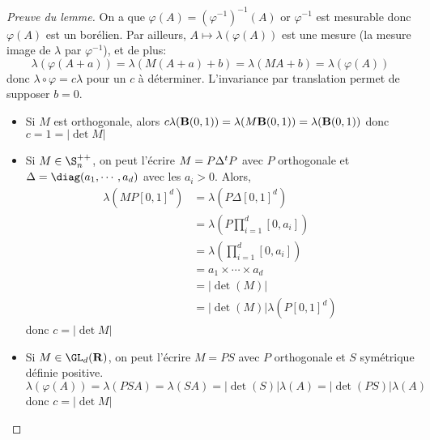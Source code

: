 \begin{proof}[Preuve du lemme]
    On a que $\varphi(A)= (\varphi^{-1})^{-1}(A)$ or $\varphi^{-1}$ est mesurable donc $\varphi(A)$ est un borélien. Par ailleurs, $A \longmapsto \lambda(\varphi(A))$ est une mesure (la mesure image de $ \lambda$ par $\varphi^{-1}$), et de plus: \[
        \lambda(\varphi(A+a))=\lambda(M(A+a)+b)=\lambda(MA+b)=\lambda(\varphi(A))
    \] 
    donc $ \lambda \circ \varphi=c\lambda$ pour un $c$ à déterminer. L'invariance par translation permet de supposer  $b=0$.
     \begin{itemize}
         \item Si $M$ est orthogonale, alors  $c\lambda(\mathbf B(0,1))=\lambda(M\mathbf B(0,1))=\lambda(\mathbf B(0,1))$ donc $c=1=|\det M|$ 
         \item Si $ M \in  \S_n^{++}$, on peut l'écrire $M=P\Delta {}^t P$ avec  $P$ orthogonale et  $\Delta = \diag(a_1, \cdots , a_d)$ avec les $a_i>0$. Alors,
             \begin{align*}
             \lambda\left(MP[0,1]^d\right) &=\lambda\left(P\Delta[0,1]^d\right) \\&=\lambda\left(P\prod_{i=1}^d [0,a_i]\right) \\&= \lambda\left(\prod_{i=1}^d[0,a_i]\right) \\&= a_1\times \cdots \times a_d \\&= |\det\left(M\right)|\\&= |\det\left(M\right)| \lambda\left(P[0,1]^d\right)
             \end{align*}
             donc $c=|\det M|$
         \item Si $ M \in  \GL_d(\R)$,  on peut l'écrire $M=PS$ avec  $P $ orthogonale et  $S$ symétrique définie positive.  \[
         \lambda(\varphi(A)) =\lambda(PSA)= \lambda(SA) =|\det(S)| \lambda(A) = |\det(PS)| \lambda(A)
         \] 
         donc $c=|\det M|$
    \end{itemize}
\end{proof}

